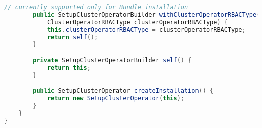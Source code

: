 \begin{lstlisting}[language=Java,label=cluster:operator:builder:pattern,caption=Cluster Operator builder pattern,frame=tb]
        // currently supported only for Bundle installation
        public SetupClusterOperatorBuilder withClusterOperatorRBACType(
            ClusterOperatorRBACType clusterOperatorRBACType) {
            this.clusterOperatorRBACType = clusterOperatorRBACType;
            return self();
        }

        private SetupClusterOperatorBuilder self() {
            return this;
        }

        public SetupClusterOperator createInstallation() {
            return new SetupClusterOperator(this);
        }
    }
}
\end{lstlisting}